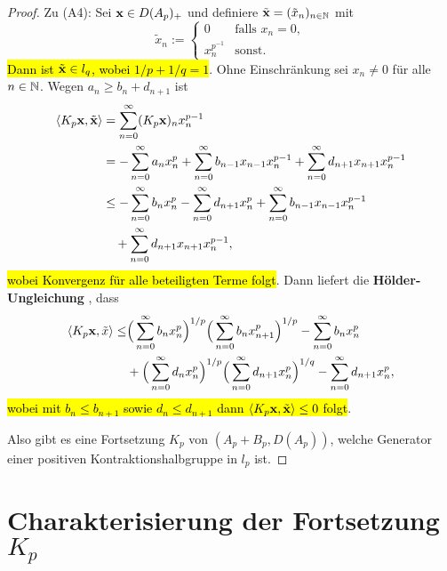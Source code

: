 \begin{proof}
\par
Zu (A4): Sei $\textnormal{\textbf{x}}\in D(A_p)_+$ und definiere $\tilde{\textnormal{\textbf{x}}} = (\tilde x_n)_{n\in\mathbb{N}}$ mit
\begin{equation*}
\tilde x_n := 
\begin{cases}
0\quad&\text{falls }x_n=0,\\
x_n^{p^{-1}}&\text{sonst.}
\end{cases}
\end{equation*}
\hl{Dann ist $\tilde{\textnormal{\textbf{x}}}\in l_q$, wobei $1/p + 1/q = 1$}. Ohne Einschränkung sei $x_n\neq 0$ für alle $n\in\mathbb{N}$.  Wegen $a_n\geq b_n + d_{n+1}$ ist
\begin{align*}
\langle K_p\textnormal{\textbf{x}}, \tilde{\textnormal{\textbf{x}}}\rangle
&= \sum_{n=0}^\infty (K_p \textnormal{\textbf{x}})_n x_n^{p-1}\\
&= -\sum_{n=0}^\infty a_n x_n^p + \sum_{n=0}^\infty b_{n-1} x_{n-1} x_n^{p-1} + \sum_{n=0}^\infty d_{n+1} x_{n+1}x_n^{p-1}\\
&\leq -\sum_{n=0}^\infty b_n x_n^p - \sum_{n=0}^\infty d_{n+1}x_n^p + \sum_{n=0}^\infty b_{n-1} x_{n-1} x_n^{p-1}\\
&\quad + \sum_{n=0}^\infty d_{n+1}x_{n+1} x_n^{p-1},
\end{align*}
\hl{wobei Konvergenz für alle beteiligten Terme folgt}. Dann liefert die \index{}\textbf{Hölder-Ungleichung} \Cref{}, dass
\begin{align*}
\langle K_p \textnormal{\textbf{x}}, \tilde x\rangle 
\leq &\Big(\sum_{n=0}^\infty b_n x_n^p\Big)^{1/p}\Big(\sum_{n=0}^\infty b_n x_{n+1}^p\Big)^{1/p} - \sum_{n=0}^\infty b_n x_n^p\\
& + \Big(\sum_{n=0}^\infty d_n x_n^p \Big)^{1/p}\Big(\sum_{n=0}^\infty d_{n+1}x_n^p\Big)^{1/q} - \sum_{n=0}^\infty d_{n+1} x_n^p,
\end{align*}
\hl{wobei mit $b_n\leq b_{n+1}$ sowie $d_n\leq d_{n+1}$ dann $\langle K_p\textnormal{\textbf{x}}, \tilde{\textnormal{\textbf{x}}}\rangle \leq 0$ folgt}. 

\par
Also gibt es eine Fortsetzung $K_p$ von $(A_p + B_p, D(A_p))$, welche Generator einer positiven Kontraktionshalbgruppe in $l_p$ ist.
\end{proof}


\section{Charakterisierung der Fortsetzung $K_p$}


